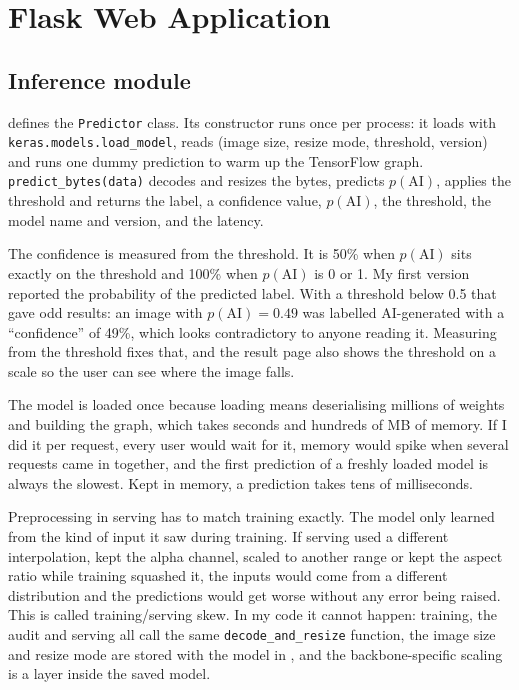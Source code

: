 \chapter{Flask Web Application}\label{ch:flask}

\section{Inference module}
 defines the \texttt{Predictor} class. Its constructor runs
once per process: it loads  with \texttt{keras.models.load\_model}, reads
 (image size, resize mode, threshold, version) and runs one dummy prediction to
warm up the TensorFlow graph. \texttt{predict\_bytes(data)} decodes and resizes the bytes, predicts
$p(\text{AI})$, applies the threshold and returns the label, a confidence value, $p(\text{AI})$,
the threshold, the model name and version, and the latency.

The confidence is measured from the threshold. It is 50\% when $p(\text{AI})$ sits exactly on the
threshold and 100\% when $p(\text{AI})$ is 0 or 1. My first version reported the probability of
the predicted label. With a threshold below 0.5 that gave odd results: an image with
$p(\text{AI})=0.49$ was labelled AI-generated with a ``confidence'' of 49\%, which looks
contradictory to anyone reading it. Measuring from the threshold fixes that, and the result page
also shows the threshold on a scale so the user can see where the image falls.

The model is loaded once because loading means deserialising millions of weights and building the
graph, which takes seconds and hundreds of MB of memory. If I did it per request, every user would
wait for it, memory would spike when several requests came in together, and the first prediction
of a freshly loaded model is always the slowest. Kept in memory, a prediction takes tens of
milliseconds.

Preprocessing in serving has to match training exactly. The model only learned from the kind of
input it saw during training. If serving used a different interpolation, kept the alpha channel,
scaled to another range or kept the aspect ratio while training squashed it, the inputs would come
from a different distribution and the predictions would get worse without any error being raised.
This is called training/serving skew. In my code it cannot happen: training, the audit and serving
all call the same \texttt{decode\_and\_resize} function, the image size and resize mode are stored
with the model in , and the backbone-specific scaling is a layer inside the
saved model.

